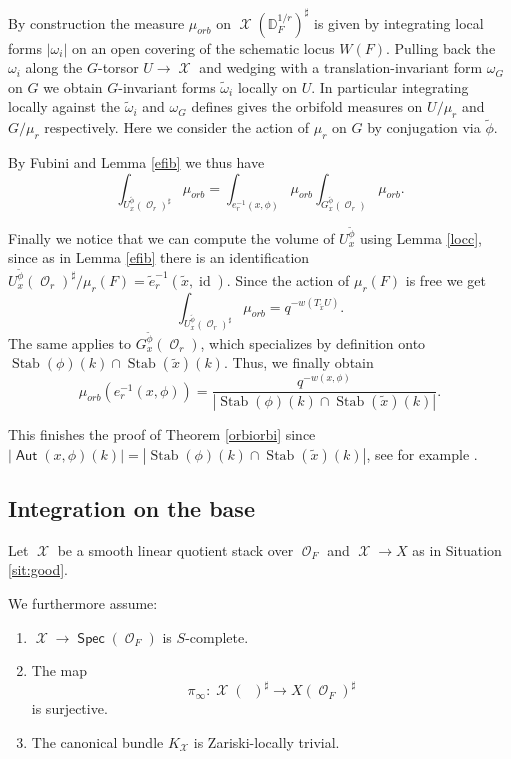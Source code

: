\documentclass{article}
\DeclareMathOperator{\Xc}{\mathcal{X}}
\DeclareMathOperator{\Oc}{\mathcal{O}}
\DeclareMathOperator{\stab}{\mathrm{Stab}}
\DeclareMathOperator{\id}{id}
\DeclareMathOperator{\Aut}{\mathsf{Aut}}
\DeclareMathOperator{\Spec}{\mathsf{Spec}}
\newcommand{\Dr}[1][r]{\mathbb{D}_F^{1/#1}}
\DeclareMathOperator{\Dinfty}{\mathbb{D}_F^{1/\infty}}
\theoremstyle{definition}
\theoremstyle{plain}
\begin{document}
By construction the measure $\mu_{orb}$ on $ \Xc(\Dr)^\sharp $ is given by integrating local forms $|\omega_i|$ on an open covering of the schematic locus $W(F)$. Pulling back the $\omega_i$ along the $G$-torsor $U \to \Xc$ and wedging with a translation-invariant form $\omega_G$ on $G$ we obtain $G$-invariant forms $\tilde{\omega}_i$ locally on $U$. In particular integrating locally against the $\tilde{\omega}_i$ and $\omega_G$ defines gives the orbifold measures on $U/\mu_r$ and $G/\mu_r$ respectively. Here we consider the action of $\mu_r$ on $G$ by conjugation via $\tilde \phi$. 

By Fubini and Lemma \ref{efib} we thus have
\[ \int_{U_{ x}^{\tilde{\phi}}(\Oc_r)^\sharp } \mu_{orb} = \int_{e_r^{-1}(x,\phi) }\mu_{orb} \int_{G_{x}^{\tilde{\phi}}(\Oc_r)} \mu_{orb}. \]

Finally we notice that we can compute the volume of $U_{x}^{\tilde{\phi}} $ using Lemma \ref{locc}, since as in Lemma \ref{efib} there is an identification $U_{x}^{\tilde{\phi}}(\Oc_r)^\sharp /\mu_r(F)  = \tilde{e}^{-1}_r (\tilde{x},\id)$. Since the action of $\mu_r(F)$ is free we get 
\[ \int_{U_{ x}^{\tilde{\phi}}(\Oc_r)^\sharp } \mu_{orb} = q^{-w(T_{\tilde x}U)}.  \] 
The same applies to $G_{x}^{\tilde{\phi}}(\Oc_r)$, which specializes by definition onto $\stab(\phi)(k) \cap \stab(\tilde{x})(k)$. Thus, we finally obtain
 \[\mu_{orb}(e_r^{-1}(x,\phi)) =  \frac{ q^{-w(x,\phi)} }{|\stab(\phi)(k) \cap \stab(\tilde{x})(k)|}.\] 

This finishes the proof of Theorem \ref{orbiorbi} since $|\Aut(x,\phi)(k)| = |\stab(\phi)(k) \cap \stab(\tilde{x})(k)|$, see for example \cite[Lemma 2.10]{GWZ20b}.






\subsection{Integration on the base}\label{iob}

Let $\Xc$ be a smooth linear quotient stack over $\Oc_F$ and $\Xc \to X$ as in Situation \ref{sit:good}.

We furthermore assume:
\begin{enumerate}
\item $\Xc \to \Spec(\Oc_F)$ is $S$-complete.
\item The map 
\[ \pi_{\infty}\colon \Xc(\Dinfty)^\sharp \to X(\Oc_F)^\sharp\]
is surjective.
\item The canonical bundle $K_{\Xc}$ is Zariski-locally trivial.     
\end{enumerate}
\end{document}
